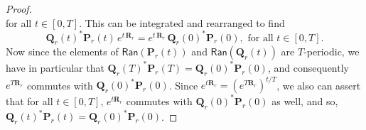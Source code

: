 \documentclass[pdflatex,sn-mathphys-num]{sn-jnl}%
\theoremstyle{thmstyleone}%
\theoremstyle{thmstyletwo}%
\theoremstyle{thmstylethree}%
\begin{document}
\begin{proof}
\begin{equation*}
\end{equation*}
for all $t\in[0,T]$.  This can be integrated and rearranged to find $$
\mathbf{Q}_r(t)^{*}\mathbf{P}_r(t)\,e^{t\,\mathbf{R}_r}=e^{t\,\mathbf{R}_r}\,\mathbf{Q}_r(0)^{*}\mathbf{P}_r(0), \mbox{ for all } t\in[0,T].
$$    
Now since the elements of $\mathsf{Ran}(\mathbf{P}_r(t))$ and $\mathsf{Ran}(\mathbf{Q}_r(t))$ are $T$-periodic, we have in particular that $\mathbf{Q}_r(T)^{*}\mathbf{P}_r(T)=\mathbf{Q}_r(0)^{*}\mathbf{P}_r(0)$, and consequently $e^{T\mathbf{R}_{r}}$ commutes with $\mathbf{Q}_r(0)^{*}\mathbf{P}_r(0)$.  Since $e^{t\mathbf{R}_{r}}=\left(e^{T\mathbf{R}_{r}}\right)^{t/T}$, we also can assert that for all $t\in[0,T]$, $e^{t\mathbf{R}_{r}}$ commutes with $\mathbf{Q}_r(0)^{*}\mathbf{P}_r(0)$ as well, and so,  $\mathbf{Q}_r(t)^{*}\mathbf{P}_r(t)=\mathbf{Q}_r(0)^{*}\mathbf{P}_r(0)$.
\end{proof}
\end{document}
